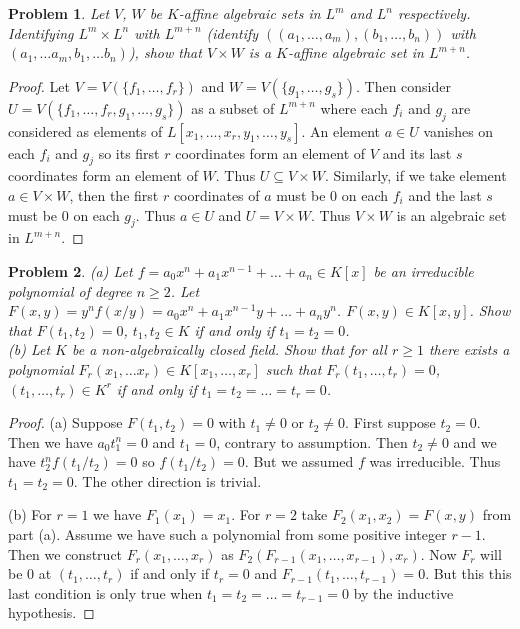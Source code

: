 \documentclass{article}
\newtheorem{problem}{Problem}
\begin{document}
\begin{problem}
Let $V$, $W$ be $K$-affine algebraic sets in $L^m$ and $L^n$ respectively. Identifying $L^m \times L^n$ with $L^{m+n}$ (identify $((a_1, \dots , a_m), (b_1, \dots , b_n))$ with $(a_1, \dots a_m, b_1, \dots b_n)$), show that $V \times W$ is a $K$-affine algebraic set in $L^{m+n}$.
\end{problem}
\begin{proof}
Let $V = V(\{f_1, \dots , f_r\})$ and $W = V(\{g_1, \dots , g_s\})$. Then consider $U = V(\{f_1, \dots , f_r, g_1, \dots , g_s\})$ as a subset of $L^{m+n}$ where each $f_i$ and $g_j$ are considered as elements of $L[x_1, \dots , x_r, y_1, \dots , y_s]$. An element $a \in U$ vanishes on each $f_i$ and $g_j$ so its first $r$ coordinates form an element of $V$ and its last $s$ coordinates form an element of $W$. Thus $U \subseteq V \times W$. Similarly, if we take element $a \in V \times W$, then the first $r$ coordinates of $a$ must be $0$ on each $f_i$ and the last $s$ must be $0$ on each $g_j$. Thus $a \in U$ and $U = V \times W$. Thus $V \times W$ is an algebraic set in $L^{m+n}$.
\end{proof}

\begin{problem}
\label{polys}
(a) Let $f = a_0x^n + a_1x^{n-1} + \dots + a_n \in K[x]$ be an irreducible polynomial of degree $n \geq 2$. Let $F(x,y) = y^n f(x/y) = a_0x^n + a_1x^{n-1}y + \dots + a_ny^n$. $F(x,y) \in K[x,y]$. Show that $F(t_1, t_2) = 0$, $t_1, t_2 \in K$ if and only if $t_1 = t_2 = 0$.\\
(b) Let $K$ be a \emph{non-algebraically closed field}. Show that for all $r \geq 1$ there exists a polynomial $F_r(x_1, \dots x_r) \in K[x_1, \dots , x_r]$ such that $F_r(t_1, \dots , t_r) = 0$, $(t_1, \dots , t_r) \in K^r$ if and only if $t_1 = t_2 = \dots = t_r = 0$.
\end{problem}
\begin{proof}
(a) Suppose $F(t_1, t_2) = 0$ with $t_1 \neq 0$ or $t_2 \neq 0$. First suppose $t_2 = 0$. Then we have $a_0t_1^n = 0$ and $t_1 = 0$, contrary to assumption. Then $t_2 \neq 0$ and we have $t_2^n f(t_1/t_2) = 0$ so $f(t_1/t_2) = 0$. But we assumed $f$ was irreducible. Thus $t_1 = t_2 = 0$. The other direction is trivial.

(b) For $r = 1$ we have $F_1(x_1) = x_1$. For $r = 2$ take $F_2(x_1, x_2) = F(x,y)$ from part (a). Assume we have such a polynomial from some positive integer $r-1$. Then we construct $F_r(x_1, \dots , x_r)$ as $F_2(F_{r-1}(x_1, \dots , x_{r-1}), x_r)$. Now $F_r$ will be $0$ at $(t_1, \dots , t_r)$ if and only if $t_r = 0$ and $F_{r-1}(t_1, \dots , t_{r-1}) = 0$. But this this last condition is only true when $t_1 = t_2 = \dots = t_{r-1} = 0$ by the inductive hypothesis.
\end{proof}
\end{document}
